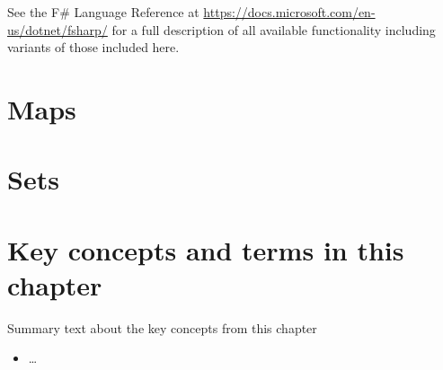 \documentclass[fsharpNotes.tex]{subfiles}
\begin{document}
See the F\# Language Reference at \url{https://docs.microsoft.com/en-us/dotnet/fsharp/} for a full description of all available functionality including variants of those included here.

\section{Maps}

\section{Sets}

\section{Key concepts and terms in this chapter}
Summary text about the key concepts from this chapter
\begin{itemize}
\item \ldots
\end{itemize}
\end{document}
